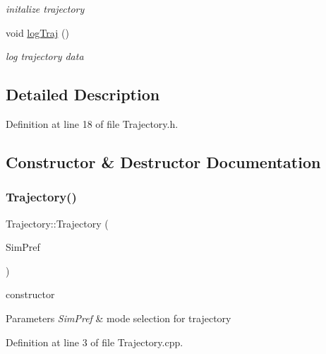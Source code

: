 \begin{DoxyCompactItemize}
\begin{DoxyCompactList}\small\item\em initalize trajectory \end{DoxyCompactList}\item 
void \hyperlink{class_trajectory_abe592d5604997ea7ed8ce24c1750100f}{log\+Traj} ()
\begin{DoxyCompactList}\small\item\em log trajectory data \end{DoxyCompactList}\end{DoxyCompactItemize}


\subsection{Detailed Description}


Definition at line 18 of file Trajectory.\+h.



\subsection{Constructor \& Destructor Documentation}
\mbox{\label{class_trajectory_a8d2001c718f24b178ca0dd84ec1a3960}} 
\subsubsection{\texorpdfstring{Trajectory()}{Trajectory()}}
{\footnotesize\ttfamily Trajectory\+::\+Trajectory (\begin{DoxyParamCaption}\item[{Sim\+D\+Preference \&}]{Sim\+Pref }\end{DoxyParamCaption})}



constructor 


\begin{DoxyParams}{Parameters}
{\em Sim\+Pref} & mode selection for trajectory \\
\hline
\end{DoxyParams}


Definition at line 3 of file Trajectory.\+cpp.

\mbox{\label{class_trajectory_ac673c37025ca5353ad99ab41c936e75d}} 
